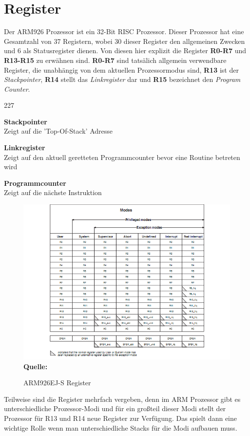 \section{Register}
Der ARM926 Prozessor ist ein 32-Bit RISC Prozessor. Dieser Prozessor hat eine Gesamtzahl von 37 Registern\parencite[vgl.][44\psqq]{archManI}, wobei 30 dieser Register den allgemeinen Zwecken und 6 als Statusregister dienen. Von diesen hier explizit die Register \textbf{R0-R7} und \textbf{R13-R15} zu erw\"ahnen sind. \textbf{R0-R7} sind tats\"alich allgemein verwendbare Register, die unabh\"angig von dem aktuellen Prozessormodus sind, \textbf{R13} ist der \textit{Stackpointer}, \textbf{R14} stellt das \textit{Linkregister} dar und \textbf{R15} bezeichnet den \textit{Program Counter}.
\begin{dinglist}{227}
	\item{\textbf{Stackpointer}}\\
	Zeigt auf die 'Top-Of-Stack' Adresse
	\item{\textbf{Linkregister}}\\
	Zeigt auf den aktuell geretteten Programmcounter bevor eine Routine betreten wird
	\item{\textbf{Programmcounter}}\\
	Zeigt auf die n\"achste Instruktion
\end{dinglist}
\begin{figure}[H]
\center
\includegraphics[scale=0.7]{common/register.png}\\
\footnotesize\textbf{Quelle:}\parencite[43]{archManI}
\caption{ARM926EJ-S Register}
\end{figure}
Teilweise sind die Register mehrfach vergeben, denn im ARM Prozessor gibt es unterschiedliche Prozessor-Modi und f\"ur ein gro\ss teil dieser Modi stellt der Prozessor f\"ur R13 und R14 neue Register zur Verf\"ugung. Das spielt dann eine wichtige Rolle wenn man unterschiedliche Stacks f\"ur die Modi aufbauen muss.
